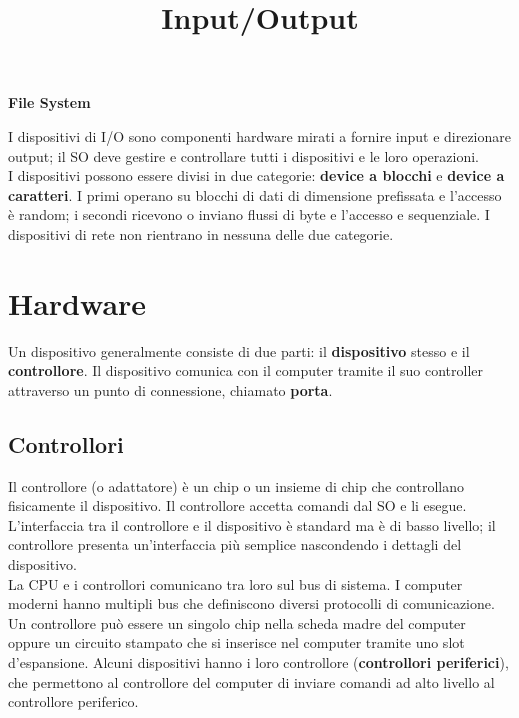 \documentclass[12pt]{article}
\title{Input/Output}
\begin{document}
\begin{center}
    \huge\textbf{File System}
\end{center}
I dispositivi di I/O sono componenti hardware mirati a fornire input e direzionare output; il SO deve gestire e controllare 
tutti i dispositivi e le loro operazioni.\\
I dispositivi possono essere divisi in due categorie: \textbf{device a blocchi} e \textbf{device a caratteri}. I primi 
operano su blocchi di dati di dimensione prefissata e l'accesso è random; i secondi ricevono o inviano flussi di byte e 
l'accesso e sequenziale. I dispositivi di rete non rientrano in nessuna delle due categorie.
\section{Hardware}
Un dispositivo generalmente consiste di due parti: il \textbf{dispositivo} stesso e il \textbf{controllore}. Il dispositivo 
comunica con il computer tramite il suo controller attraverso un punto di connessione, chiamato \textbf{porta}.
\subsection{Controllori}
Il controllore (o adattatore) è un chip o un insieme di chip che controllano fisicamente il dispositivo. Il controllore 
accetta comandi dal SO e li esegue. L'interfaccia tra il controllore e il dispositivo è standard ma è di basso livello; 
il controllore presenta un'interfaccia più semplice nascondendo i dettagli del dispositivo.\\
La CPU e i controllori comunicano tra loro sul bus di sistema. I computer moderni hanno multipli bus che definiscono 
diversi protocolli di comunicazione. Un controllore può essere un singolo chip nella scheda madre del computer oppure 
un circuito stampato che si inserisce nel computer tramite uno slot d'espansione. Alcuni dispositivi hanno i loro controllore
(\textbf{controllori periferici}), che permettono al controllore del computer di inviare comandi ad alto livello al controllore 
periferico.
\end{document}

